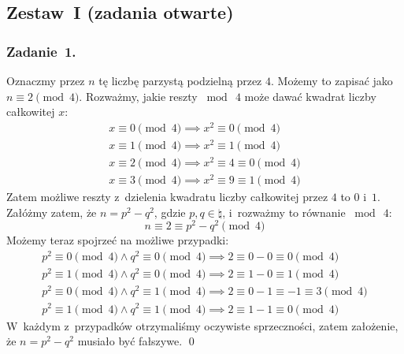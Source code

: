 \subsection*{Zestaw~I (zadania otwarte)}
\subsubsection*{Zadanie~1.}
Oznaczmy przez \(n\) tę liczbę parzystą podzielną przez \(4\). Możemy to zapisać jako \(n \equiv 2 \pmod{4}\). Rozważmy, jakie reszty \(\bmod\ 4\) może dawać kwadrat liczby całkowitej \(x\):
\begin{gather*}
    x \equiv 0 \pmod{4} \implies x^2 \equiv 0 \pmod{4}\\
    x \equiv 1 \pmod{4} \implies x^2 \equiv 1 \pmod{4}\\
    x \equiv 2 \pmod{4} \implies x^2 \equiv 4 \equiv 0 \pmod{4}\\
    x \equiv 3 \pmod{4} \implies x^2 \equiv 9 \equiv 1 \pmod{4}
\end{gather*}
Zatem możliwe reszty z~dzielenia kwadratu liczby całkowitej przez \(4\) to \(0\) i~\(1\). Załóżmy zatem, że \(n = p^2 - q^2\), gdzie \(p, q \in \natural\), i~rozważmy to równanie \(\bmod\ 4\):
\begin{equation*}
    n \equiv 2 \equiv p^2 - q^2 \pmod{4}
\end{equation*}
Możemy teraz spojrzeć na możliwe przypadki:
\begin{gather*}
    p^2 \equiv 0 \pmod{4} \land q^2 \equiv 0 \pmod{4} \implies 2 \equiv 0 - 0 \equiv 0 \pmod{4}\\
    p^2 \equiv 1 \pmod{4} \land q^2 \equiv 0 \pmod{4} \implies 2 \equiv 1 - 0 \equiv 1 \pmod{4}\\
    p^2 \equiv 0 \pmod{4} \land q^2 \equiv 1 \pmod{4} \implies 2 \equiv 0 - 1 \equiv -1 \equiv 3 \pmod{4}\\
    p^2 \equiv 1 \pmod{4} \land q^2 \equiv 1 \pmod{4} \implies 2 \equiv 1 - 1 \equiv 0 \pmod{4}
\end{gather*}
W~każdym z~przypadków otrzymaliśmy oczywiste sprzeczności, zatem założenie, że \(n = p^2 - q^2\) musiało być fałszywe.
\qed
